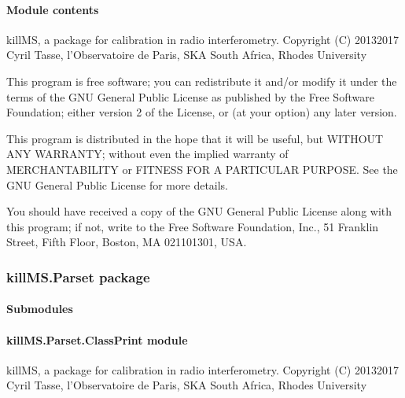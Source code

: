 \documentclass[letterpaper,10pt,english]{sphinxmanual}
\begin{document}
\paragraph{Module contents}
\label{\detokenize{api/killMS.Other:module-killMS.Other}}\label{\detokenize{api/killMS.Other:module-contents}}
\sphinxAtStartPar
killMS, a package for calibration in radio interferometry.
Copyright (C) 2013\sphinxhyphen{}2017  Cyril Tasse, l’Observatoire de Paris,
SKA South Africa, Rhodes University

\sphinxAtStartPar
This program is free software; you can redistribute it and/or
modify it under the terms of the GNU General Public License
as published by the Free Software Foundation; either version 2
of the License, or (at your option) any later version.

\sphinxAtStartPar
This program is distributed in the hope that it will be useful,
but WITHOUT ANY WARRANTY; without even the implied warranty of
MERCHANTABILITY or FITNESS FOR A PARTICULAR PURPOSE.  See the
GNU General Public License for more details.

\sphinxAtStartPar
You should have received a copy of the GNU General Public License
along with this program; if not, write to the Free Software
Foundation, Inc., 51 Franklin Street, Fifth Floor, Boston, MA  02110\sphinxhyphen{}1301, USA.

\sphinxstepscope


\subsubsection{killMS.Parset package}
\label{\detokenize{api/killMS.Parset:killms-parset-package}}\label{\detokenize{api/killMS.Parset::doc}}

\paragraph{Submodules}
\label{\detokenize{api/killMS.Parset:submodules}}

\paragraph{killMS.Parset.ClassPrint module}
\label{\detokenize{api/killMS.Parset:module-killMS.Parset.ClassPrint}}\label{\detokenize{api/killMS.Parset:killms-parset-classprint-module}}
\sphinxAtStartPar
killMS, a package for calibration in radio interferometry.
Copyright (C) 2013\sphinxhyphen{}2017  Cyril Tasse, l’Observatoire de Paris,
SKA South Africa, Rhodes University
\end{document}
